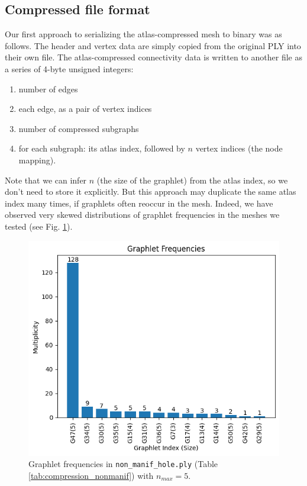\documentclass{egpubl}
\begin{document}
\subsection{Compressed file format}

Our first approach to serializing the atlas-compressed mesh to binary was as follows. The header and vertex data are simply copied from the original PLY into their own file.
The atlas-compressed connectivity data is written to another file as a series of 4-byte unsigned integers:
\begin{enumerate}
        \item number of edges
        \item each edge, as a pair of vertex indices
        \item number of compressed subgraphs
        \item for each subgraph: its atlas index, followed by $n$ vertex indices (the node mapping).
\end{enumerate}
Note that we can infer $n$ (the size of the graphlet) from the atlas index, so we don't need to store it explicitly. But this approach may duplicate the same atlas index many times, if graphlets often reoccur in the mesh. Indeed, we have observed very skewed distributions of graphlet frequencies in the meshes we tested (see Fig. \ref{fig:graphlet_freqs}).
\begin{figure}[htb]
\centering
\includegraphics[width=.8\linewidth]{figures/nonmf_hole_freqs.png}
%

\caption{Graphlet frequencies in \texttt{non\_manif\_hole.ply} (Table \ref{tab:compression_nonmanif}) with $n_{max} = 5$.}
\label{fig:graphlet_freqs}
\end{figure}
\end{document}
